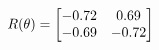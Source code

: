 \documentclass[preview]{standalone}
\begin{document}
\begin{align*}
\special{dvisvgm:raw <g id='unique000'>}R(\theta) = \begin{bmatrix}-0.72 & 0.69\\-0.69 & -0.72\end{bmatrix}\special{dvisvgm:raw </g>}
\end{align*}
\end{document}
